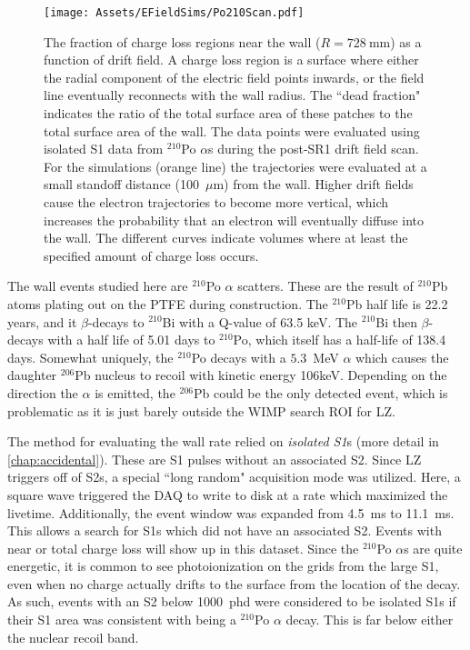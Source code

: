 \begin{figure}
    \centering
    \texttt{[image: Assets/EFieldSims/Po210Scan.pdf]}
    \caption[The fraction of charge loss regions near the wall ($R=728\mathrm{~mm}$) as a function of drift field.]%
    {The fraction of charge loss regions near the wall ($R=728\mathrm{~mm}$) as a function of drift field.
    A charge loss region is a surface where either the radial component of the electric field points inwards, or the field line eventually reconnects with the wall radius.
    The ``dead fraction" indicates the ratio of the total surface area of these patches to the total surface area of the wall.
    The data points were evaluated using isolated S1 data from $^{210}$Po $\alpha$s during the post-SR1 drift field scan.
    For the simulations (orange line) the trajectories were evaluated at a small standoff distance (100~$\mu$m) from the wall.
    Higher drift fields cause the electron trajectories to become more vertical, which increases the probability that an electron will eventually diffuse into the wall.
    The different curves indicate volumes where at least the specified amount of charge loss occurs.}
    \label{fig:attachment_cathode_charge}
\end{figure}

The wall events studied here are $^{210}$Po $\alpha $ scatters.
These are the result  of $^{210}$Pb atoms plating out on the PTFE during construction.
The $^{210}$Pb half life is 22.2 years, and it $\beta$-decays to $^{210}$Bi with a Q-value of 63.5 keV.
The $^{210}$Bi then $\beta$-decays with a half life of 5.01 days to $^{210}$Po, which itself has a half-life of 138.4 days.
Somewhat uniquely, the $^{210}$Po decays with a $5.3$~MeV $\alpha$ which causes the daughter $^{206}$Pb nucleus to recoil with kinetic energy 106keV.
Depending on the direction the $\alpha$ is emitted, the $^{206}$Pb could be the only detected event, which is problematic as it is just barely outside the WIMP search ROI for LZ.

The method for evaluating the wall rate relied on \textit{isolated S1}s (more detail in \ref{chap:accidental}).
These are S1 pulses without an associated S2. 
Since LZ triggers off of S2s, a special ``long random" acquisition mode was utilized.
Here, a square wave triggered the DAQ to write to disk at a rate which maximized the livetime.
Additionally, the event window was expanded from 4.5~ms to 11.1~ms.
This allows a search for S1s which did not have an associated S2.
Events with near or total charge loss will show up in this dataset.
Since the  $^{210}$Po $\alpha$s are quite energetic, it is common to see photoionization on the grids from the large S1, even when no charge actually drifts to the surface from the location of the decay.
As such, events with an S2 below 1000~phd were considered to be isolated S1s if their S1 area was consistent with being a $^{210}$Po $\alpha$ decay.
This is far below either the nuclear recoil band.

